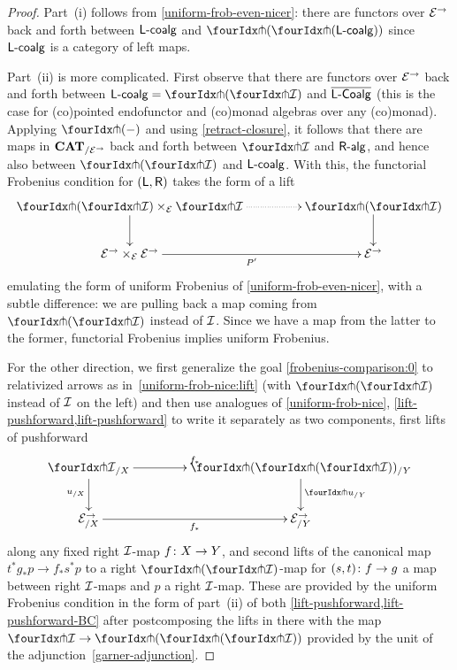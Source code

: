 \documentclass[reqno,10pt,a4paper,oneside,draft]{amsart}
\begin{document}
{\begin{proof}
Part~(i) follows from \cref{uniform-frob-even-nicer}: there are functors over $\cal{E}^\to$ back and forth between $\pcoalg{\LL}$ and $\liftl{(\liftr{(\pcoalg{\LL})})}$ since $\pcoalg{\LL}$ is a category of left maps.

Part~(ii) is more complicated.
First observe that there are functors over $\cal{E}^\to$ back and forth between $\pcoalg{\LL} = \liftl{(\liftr{\cal{I}})}$ and $\overline{\pCoalg{\LL}}$ (this is the case for (co)pointed endofunctor and (co)monad algebras over any (co)monad).
Applying $\liftr{(-)}$ and using \cref{retract-closure}, it follows that there are maps in $\CAT_{/\cal{E}^\to}$ back and forth between $\liftr{\cal{I}}$ and $\palg{\RR}$, and hence also between $\liftl{(\liftr{\cal{I}})}$ and $\pcoalg{\LL}$.
With this, the functorial Frobenius condition for $(\LL, \RR)$ takes the form of a lift
\begin{equation} \label{frobenius-comparison:0}
\begin{gathered}
\xymatrix@C+2em{
  \liftl{(\liftr{\cal{I}})} \times_{\cal{E}} \liftr{\cal{I}}
  \ar@{.>}[r]
  \ar[d]
&
  \liftl{(\liftr{\cal{I}})}
  \ar[d]
\\
  \cal{E}^\to \times_{\cal{E}} \cal{E}^\to
  \ar[r]_{P'}
&
  \cal{E}^\to
}
\end{gathered}
\end{equation}
emulating the form of uniform Frobenius of \cref{uniform-frob-even-nicer}, with a subtle difference: we are pulling back a map coming from $\liftl{(\liftr{\cal{I}})}$ instead of $\cal{I}$.
Since we have a map from the latter to the former, functorial Frobenius implies uniform Frobenius.

For the other direction, we first generalize the goal \eqref{frobenius-comparison:0} to relativized arrows as in~\eqref{uniform-frob-nice:lift} (with $\liftl{(\liftr{\cal{I}})}$ instead of $\cal{I}$ on the left) and then use analogues of \cref{uniform-frob-nice}, \cref{lift-pushforward,lift-pushforward} to write it separately as two components, first lifts of pushforward
\[
\xymatrix@C=1.5cm{
  {\liftr{\cal{I}}}_{/X}
  \ar[r]^{f_*}
  \ar[d]_{u_{/X}}
&
  \liftr{(\liftl{({\liftr{\cal{I}}})})}_{/Y}
  \ar[d]^{{\liftr{u}}_{/Y}}
\\
  \catE_{/X}^\to
  \ar[r]_{f_*}
&
  \catE_{/Y}^\to
}
\]
along any fixed right $\cal{I}$-map $f \co X \to Y$, and second lifts of the canonical map $t^* g_* p \to f_* s^* p$ to a right $\liftl{(\liftr{\cal{I}})}$-map for $(s, t) \co f \to g$ a map between right $\cal{I}$-maps and $p$ a right $\cal{I}$-map.
These are provided by the uniform Frobenius condition in the form of part~(ii) of both \cref{lift-pushforward,lift-pushforward-BC} after postcomposing the lifts in there with the map $\liftr{\cal{I}} \to \liftr{(\liftl{(\liftr{\cal{I}})})}$ provided by the unit of the adjunction~\eqref{garner-adjunction}.
\end{proof}
}
\end{document}
